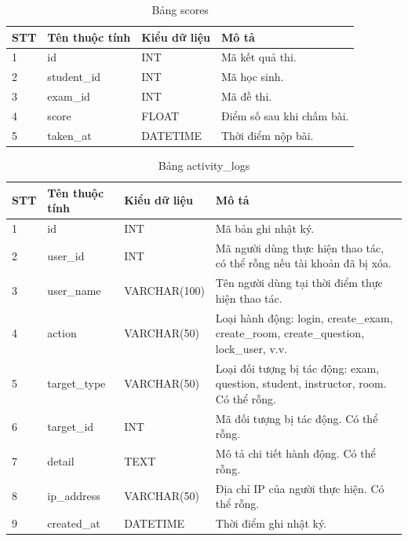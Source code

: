 \documentclass[12pt,a4paper]{article}
\begin{document}
	\begin{table}[H]
		\centering
		\caption{Bảng scores}
		\label{tab:scores}
		\begin{tabular}{|p{1.5cm}|p{4cm}|p{4cm}|p{5.5cm}|}
			\hline
			\centering\textbf{STT} & \centering\textbf{Tên thuộc tính} & \centering\textbf{Kiểu dữ liệu} & \centering\arraybackslash\textbf{Mô tả} \\
			\hline
			1 & id & INT & Mã kết quả thi. \\
			\hline
			2 & student\_id & INT & Mã học sinh. \\
			\hline
			3 & exam\_id & INT & Mã đề thi. \\
			\hline
			4 & score & FLOAT & Điểm số sau khi chấm bài. \\
			\hline
			5 & taken\_at & DATETIME & Thời điểm nộp bài. \\
			\hline
		\end{tabular}
	\end{table}
	
	\begin{table}[H]
		\centering
		\caption{Bảng activity\_logs}
		\label{tab:activity_logs}
		\begin{tabular}{|p{1.5cm}|p{4cm}|p{4cm}|p{5.5cm}|}
			\hline
			\centering\textbf{STT} & \centering\textbf{Tên thuộc tính} & \centering\textbf{Kiểu dữ liệu} & \centering\arraybackslash\textbf{Mô tả} \\
			\hline
			1 & id & INT & Mã bản ghi nhật ký. \\
			\hline
			2 & user\_id & INT & Mã người dùng thực hiện thao tác, có thể rỗng nếu tài khoản đã bị xóa. \\
			\hline
			3 & user\_name & VARCHAR(100) & Tên người dùng tại thời điểm thực hiện thao tác. \\
			\hline
			4 & action & VARCHAR(50) & Loại hành động: login, create\_exam, create\_room, create\_question, lock\_user, v.v. \\
			\hline
			5 & target\_type & VARCHAR(50) & Loại đối tượng bị tác động: exam, question, student, instructor, room. Có thể rỗng. \\
			\hline
			6 & target\_id & INT & Mã đối tượng bị tác động. Có thể rỗng. \\
			\hline
			7 & detail & TEXT & Mô tả chi tiết hành động. Có thể rỗng. \\
			\hline
			8 & ip\_address & VARCHAR(50) & Địa chỉ IP của người thực hiện. Có thể rỗng. \\
			\hline
			9 & created\_at & DATETIME & Thời điểm ghi nhật ký. \\
			\hline
		\end{tabular}
	\end{table}
	
\end{document}
